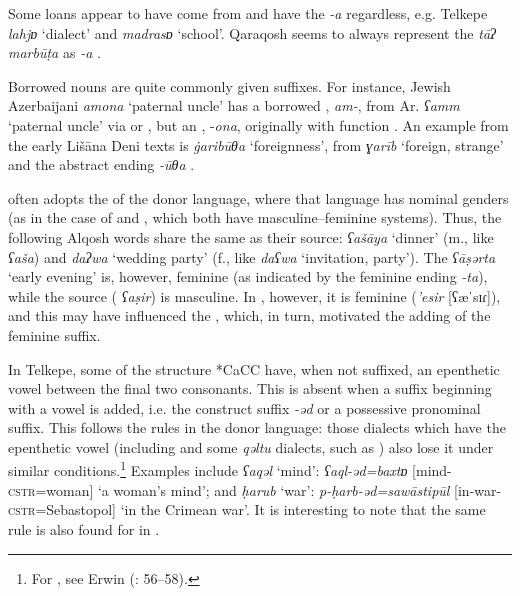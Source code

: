 \documentclass[output=paper]{langsci/langscibook}
\begin{document}
Some loans appear to have come from   and have the \textit{\nobreakdash-a} regardless, e.g.  Telkepe \textit{lahjɒ} ‘dialect’ and \textit{madrasɒ} ‘school’.  Qaraqosh seems to always represent the \textit{tāʔ} \textit{marbūṭa} as \textit{{}-a} \citep[204]{Khan2002}.

Borrowed nouns are quite commonly given   suffixes. For instance, Jewish Azerbaijani \textit{amona} ‘paternal uncle’ has a borrowed , \textit{am-}, from Ar. \textit{ʕamm} ‘paternal uncle’ via  or , but an  , \nobreakdash-\textit{ona}, originally with  function \citep[165]{Garbell1965}. An example from the early Lišāna Deni texts is \textit{\.garibūθa} ‘foreignness’, from  \textit{ɣarīb} ‘foreign, strange’ and the  abstract ending \textit{{}-ūθa} \citep[205]{Sabar1984}.

 often adopts the  of the donor language, where that language has nominal genders (as in the case of  and  , which both have masculine--feminine  systems). Thus, the following  Alqosh words share the same  as their  source: \textit{ʕašāya} ‘dinner’ (m., like   \textit{ʕaša}) and \textit{daʔwa} ‘wedding party’ (f., like  \textit{daʕwa} ‘invitation, party’). The  \textit{ʕāṣərta} ‘early evening’ is, however, feminine (as indicated by the  feminine ending \textit{{}-ta}), while the  source (  \textit{ʕaṣir}) is masculine. In  , however, it is feminine (\textit{{}'esir} [ʕæˈsɪɾ]), and this may have influenced the , which, in turn, motivated the adding of the feminine suffix.

In  Telkepe, some   of the structure *CaCC have, when not suffixed, an epenthetic vowel between the final two consonants. This is absent when a suffix beginning with a vowel is added, i.e. the construct suffix \textit{{}-əd} or a possessive pronominal suffix. This follows the rules in the donor language: those  dialects which have the epenthetic vowel (including  and some \textit{qəltu} dialects, such as ) also lose it under similar conditions.\footnote{For  , see Erwin (\citeyear{Erwin1963}: 56–58).} Examples include \textit{ʕaqəl} ‘mind’: \textit{ʕaql-əd=baxtɒ} [mind-\textsc{cstr}=woman] ‘a woman's mind'; and \textit{ḥarub} ‘war’: \textit{p\nobreakdash-ḥarb\nobreakdash-əd=sawāstipūl} [in-war-\textsc{cstr}=Sebastopol] ‘in the Crimean war’. It is interesting to note that the same rule is also found for   in  \citep[5]{Thackston2006}.
\end{document}

